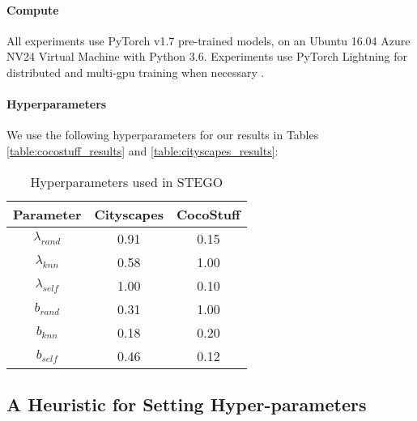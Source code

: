 \documentclass{article} \usepackage{iclr2022_conference,times}
\begin{document}
\paragraph{Compute} All experiments use PyTorch \citep{pytorch} v1.7 pre-trained models, on an Ubuntu 16.04 Azure NV24 Virtual Machine with Python 3.6. Experiments use PyTorch Lightning for distributed and multi-gpu training when necessary \citep{pytorch-lightning}.

\paragraph{Hyperparameters}
We use the following hyperparameters for our results in Tables \ref{table:cocostuff_results} and \ref{table:cityscapes_results}:


\begin{table}[h]
\caption{Hyperparameters used in STEGO}
\centering
\begin{tabular}{ccc}
\textbf{Parameter} & \textbf{Cityscapes} & \textbf{CocoStuff} \\ \hline
$\lambda_{rand}$   & 0.91                & 0.15               \\
$\lambda_{knn}$    & 0.58                & 1.00               \\
$\lambda_{self}$   & 1.00                & 0.10               \\
$b_{rand}$         & 0.31                & 1.00               \\
$b_{knn}$          & 0.18                & 0.20               \\
$b_{self}$         & 0.46                & 0.12              
\end{tabular}
\end{table}

\newpage

\subsection{A Heuristic for Setting Hyper-parameters}
\end{document}
